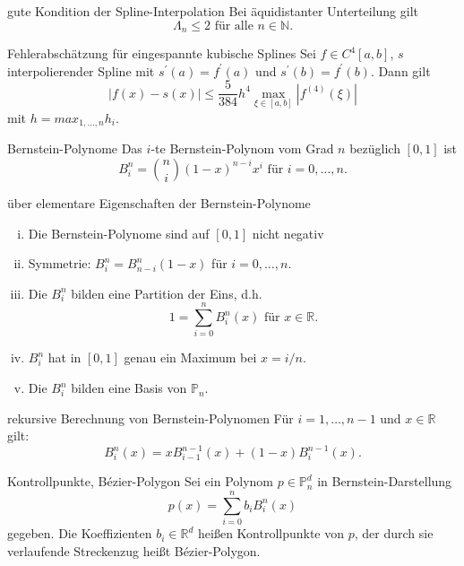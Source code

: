 \begin{flashcard}[Satz]{gute Kondition der Spline-Interpolation}
Bei äquidistanter Unterteilung gilt
$$
	\Lambda_n \leq 2 \text{ für alle } n \in \mathbb{N}.
$$
\end{flashcard}

\begin{flashcard}[Satz]{Fehlerabschätzung für eingespannte kubische Splines}
Sei $f \in C^4[a,b]$, $s$ interpolierender Spline mit $s^\prime(a) = f^\prime(a)$ und $s^\prime(b) = f^\prime(b)$.
Dann gilt
$$
	|f(x) - s(x)| \leq \frac{5}{384}h^4\max_{\xi \in [a,b]} |f^{(4)}(\xi)|
$$
mit $h = max_{1,\ldots ,n} h_i$.
\end{flashcard}

\begin{flashcard}[Definition]{Bernstein-Polynome}
Das $i$-te Bernstein-Polynom vom Grad $n$ bezüglich $[0,1]$ ist
$$
	B_i^n = \binom{n}{i}(1-x)^{n-i}x^i \text{ für } i=0, \ldots , n.
$$
\end{flashcard}

\begin{flashcard}[Satz]{über elementare Eigenschaften der Bernstein-Polynome}
\begin{enumerate}[(i)]
	\item Die Bernstein-Polynome sind auf $[0,1]$ nicht negativ
	\item Symmetrie: $B_i^n = B_{n-i}^n(1-x)$ für $ i=0, \ldots , n$.
	\item Die $B_i^n$ bilden eine Partition der Eins, d.h.
	$$
		1 = \sum_{i=0}^n B_i^n(x) \text{ für } x \in \mathbb{R}.
	$$
	\item $B_i^n$ hat in $[0,1]$ genau ein Maximum bei $x = i/n$.
	\item Die $B_i^n$ bilden eine Basis von $\mathbb{P}_n$.
\end{enumerate}
\end{flashcard}

\begin{flashcard}[Satz]{rekursive Berechnung von Bernstein-Polynomen}
Für $i=1, \ldots , n-1$ und $x \in \mathbb{R}$ gilt:
$$
	B_i^n(x) = xB_{i-1}^{n-1}(x) + (1-x)B_i^{n-1}(x).
$$
\end{flashcard}

\begin{flashcard}[Definition]{Kontrollpunkte, Bézier-Polygon}
Sei ein Polynom $p \in \mathbb{P}_n^d$ in Bernstein-Darstellung
$$
	p(x) = \sum_{i=0}^n b_i B_i^n(x)
$$
gegeben. Die Koeffizienten $b_i \in \mathbb{R}^d$ heißen Kontrollpunkte von $p$,
der durch sie verlaufende Streckenzug heißt Bézier-Polygon.
\end{flashcard}

